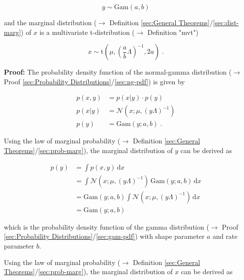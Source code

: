 \documentclass[a4paper,12pt,twoside]{book}
\begin{document}
\begin{equation} \label{eq:ng-marg-ng-marg-y}
y \sim \mathrm{Gam}(a, b)
\end{equation}

and the marginal distribution ($\rightarrow$ Definition \ref{sec:General Theorems}/\ref{sec:dist-marg}) of $x$ is a multivariate t-distribution ($\rightarrow$ Definition "mvt")

\begin{equation} \label{eq:ng-marg-ng-marg-x}
x \sim \mathrm{t}\left( \mu, \left(\frac{a}{b} \Lambda \right)^{-1}, 2a \right) \; .
\end{equation}


\vspace{1em}
\textbf{Proof:} The probability density function of the normal-gamma distribution ($\rightarrow$ Proof \ref{sec:Probability Distributions}/\ref{sec:ng-pdf}) is given by

\begin{equation} \label{eq:ng-marg-ng-pdf}
\begin{split}
p(x,y) &= p(x|y) \cdot p(y) \\
p(x|y) &= \mathcal{N}(x; \mu, (y \Lambda)^{-1}) \\
p(y) &= \mathrm{Gam}(y; a, b) \; .
\end{split}
\end{equation}

\vspace{1em}
Using the law of marginal probability ($\rightarrow$ Definition \ref{sec:General Theorems}/\ref{sec:prob-marg}), the marginal distribution of $y$ can be derived as

\begin{equation} \label{eq:ng-marg-ng-marg-y-qed}
\begin{split}
p(y) &= \int p(x,y) \, \mathrm{d}x \\
&= \int \mathcal{N}(x; \mu, (y \Lambda)^{-1}) \, \mathrm{Gam}(y; a, b) \, \mathrm{d}x \\
&= \mathrm{Gam}(y; a, b) \int \mathcal{N}(x; \mu, (y \Lambda)^{-1}) \, \mathrm{d}x \\
&= \mathrm{Gam}(y; a, b)
\end{split}
\end{equation}

which is the probability density function of the gamma distribution ($\rightarrow$ Proof \ref{sec:Probability Distributions}/\ref{sec:gam-pdf}) with shape parameter $a$ and rate parameter $b$.

\vspace{1em}
Using the law of marginal probability ($\rightarrow$ Definition \ref{sec:General Theorems}/\ref{sec:prob-marg}), the marginal distribution of $x$ can be derived as
\end{document}
